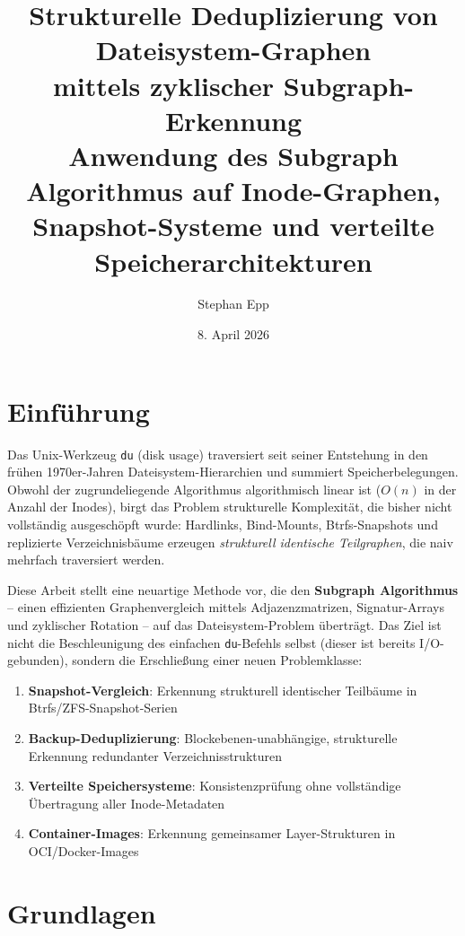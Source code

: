 ﻿\documentclass[a4paper,12pt]{article}
\title{\textbf{Strukturelle Deduplizierung von Dateisystem-Graphen\\
mittels zyklischer Subgraph-Erkennung}\\[0.5em]
\large Anwendung des Subgraph Algorithmus auf Inode-Graphen,\\
Snapshot-Systeme und verteilte Speicherarchitekturen}
\author{Stephan Epp}
\date{8. April 2026}
\theoremstyle{definition}
\begin{document}
\maketitle
\tableofcontents
\newpage

\section{Einf\"uhrung}

Das Unix-Werkzeug \texttt{du} (disk usage) traversiert seit seiner Entstehung
in den fr\"uhen 1970er-Jahren Dateisystem-Hierarchien und summiert
Speicherbelegungen. Obwohl der zugrundeliegende Algorithmus algorithmisch
linear ist ($O(n)$ in der Anzahl der Inodes), birgt das Problem strukturelle
Komplexit\"at, die bisher nicht vollst\"andig ausgesch\"opft wurde: Hardlinks,
Bind-Mounts, Btrfs-Snapshots und replizierte Verzeichnisb\"aume erzeugen
\emph{strukturell identische Teilgraphen}, die naiv mehrfach traversiert
werden.

Diese Arbeit stellt eine neuartige Methode vor, die den
\textbf{Subgraph Algorithmus} \cite{epp2026subgraph} -- einen effizienten
Graphenvergleich mittels Adjazenzmatrizen, Signatur-Arrays und zyklischer
Rotation -- auf das Dateisystem-Problem \"ubertr\"agt. Das Ziel ist nicht die
Beschleunigung des einfachen \texttt{du}-Befehls selbst (dieser ist bereits
I/O-gebunden), sondern die Erschlie\ss{}ung einer neuen Problemklasse:

\begin{enumerate}
    \item \textbf{Snapshot-Vergleich}: Erkennung strukturell identischer
          Teilb\"aume in Btrfs/ZFS-Snapshot-Serien
    \item \textbf{Backup-Deduplizierung}: Blockebenen-unabh\"angige,
          strukturelle Erkennung redundanter Verzeichnisstrukturen
    \item \textbf{Verteilte Speichersysteme}: Konsistenzpr\"ufung ohne
          vollst\"andige \"Ubertragung aller Inode-Metadaten
    \item \textbf{Container-Images}: Erkennung gemeinsamer Layer-Strukturen
          in OCI/Docker-Images
\end{enumerate}

\section{Grundlagen}
\end{document}
